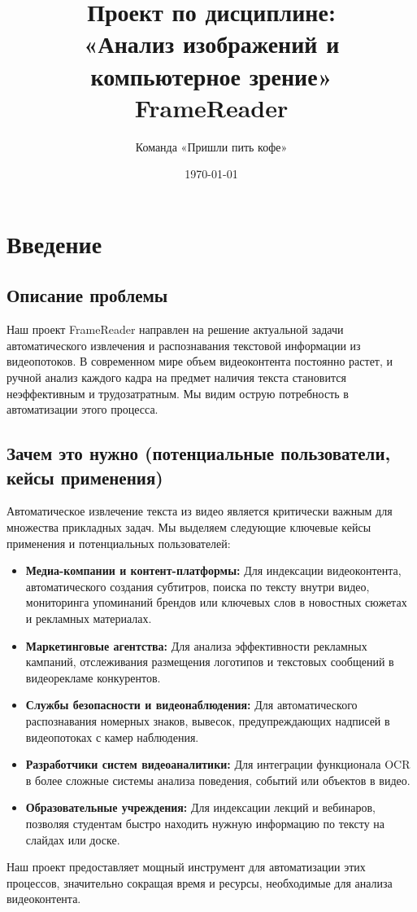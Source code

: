 \documentclass[12pt, a4paper]{article}
\title{Проект по дисциплине: \\ «Анализ изображений и компьютерное зрение» \\ FrameReader}
\author{Команда «Пришли пить кофе»}
\date{\today}
\theoremstyle{definition}
\theoremstyle{remark}
\begin{document}
	
	\maketitle
	\thispagestyle{empty}
	\newpage
	\tableofcontents
	\newpage
	\setcounter{page}{1}
	
	\section{Введение}
	\subsection{Описание проблемы}
	Наш проект FrameReader направлен на решение актуальной задачи автоматического извлечения и распознавания текстовой информации из видеопотоков. В современном мире объем видеоконтента постоянно растет, и ручной анализ каждого кадра на предмет наличия текста становится неэффективным и трудозатратным. Мы видим острую потребность в автоматизации этого процесса.
	
	\subsection{Зачем это нужно (потенциальные пользователи, кейсы применения)}
	Автоматическое извлечение текста из видео является критически важным для множества прикладных задач. Мы выделяем следующие ключевые кейсы применения и потенциальных пользователей:
	\begin{itemize}
		\item \textbf{Медиа-компании и контент-платформы:} Для индексации видеоконтента, автоматического создания субтитров, поиска по тексту внутри видео, мониторинга упоминаний брендов или ключевых слов в новостных сюжетах и рекламных материалах.
		\item \textbf{Маркетинговые агентства:} Для анализа эффективности рекламных кампаний, отслеживания размещения логотипов и текстовых сообщений в видеорекламе конкурентов.
		\item \textbf{Службы безопасности и видеонаблюдения:} Для автоматического распознавания номерных знаков, вывесок, предупреждающих надписей в видеопотоках с камер наблюдения.
		\item \textbf{Разработчики систем видеоаналитики:} Для интеграции функционала OCR в более сложные системы анализа поведения, событий или объектов в видео.
		\item \textbf{Образовательные учреждения:} Для индексации лекций и вебинаров, позволяя студентам быстро находить нужную информацию по тексту на слайдах или доске.
	\end{itemize}
	Наш проект предоставляет мощный инструмент для автоматизации этих процессов, значительно сокращая время и ресурсы, необходимые для анализа видеоконтента.
	
\end{document}
